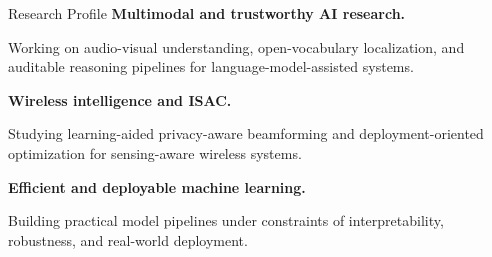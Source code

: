 \begin{rubric}{Research Profile}
\entry*[2026 -- Present]%
  \textbf{Multimodal and trustworthy AI research.}
  \par Working on audio-visual understanding, open-vocabulary localization, and auditable reasoning pipelines for language-model-assisted systems.

\entry*[2025 -- Present]%
  \textbf{Wireless intelligence and ISAC.}
  \par Studying learning-aided privacy-aware beamforming and deployment-oriented optimization for sensing-aware wireless systems.

\entry*[2024 -- Present]%
  \textbf{Efficient and deployable machine learning.}
  \par Building practical model pipelines under constraints of interpretability, robustness, and real-world deployment.
\end{rubric}
